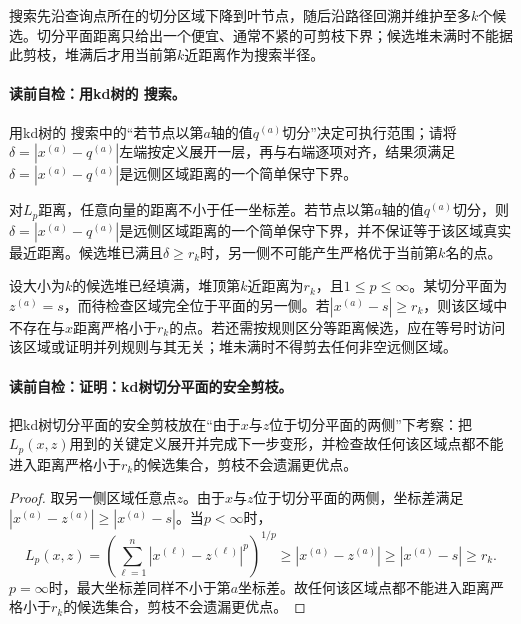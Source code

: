 搜索先沿查询点所在的切分区域下降到叶节点，随后沿路径回溯并维护至多$k$个候选。切分平面距离只给出一个便宜、通常不紧的可剪枝下界；候选堆未满时不能据此剪枝，堆满后才用当前第$k$近距离作为搜索半径。

\paragraph{读前自检：用kd树的 搜索。}用kd树的 搜索中的“若节点以第$a$轴的值$q^{(a)}$切分”决定可执行范围；请将$\delta=|x^{(a)}-q^{(a)}|$左端按定义展开一层，再与右端逐项对齐，结果须满足$\delta=|x^{(a)}-q^{(a)}|$是远侧区域距离的一个简单保守下界。\par

对$L_p$距离，任意向量的距离不小于任一坐标差。若节点以第$a$轴的值$q^{(a)}$切分，则$\delta=|x^{(a)}-q^{(a)}|$是远侧区域距离的一个简单保守下界，并不保证等于该区域真实最近距离。候选堆已满且$\delta\ge r_k$时，另一侧不可能产生严格优于当前第$k$名的点。

\begin{lemma}[kd树切分平面的安全剪枝]\label{lem:V2-C02-kd-prune}
设大小为$k$的候选堆已经填满，堆顶第$k$近距离为$r_k$，且$1\le p\le\infty$。某切分平面为$z^{(a)}=s$，而待检查区域完全位于平面的另一侧。若$|x^{(a)}-s|\ge r_k$，则该区域中不存在与$x$距离严格小于$r_k$的点。若还需按规则区分等距离候选，应在等号时访问该区域或证明并列规则与其无关；堆未满时不得剪去任何非空远侧区域。
\end{lemma}
\paragraph{读前自检：证明：kd树切分平面的安全剪枝。}把kd树切分平面的安全剪枝放在“由于$x$与$z$位于切分平面的两侧”下考察：把$L_p(x,z)$用到的关键定义展开并完成下一步变形，并检查故任何该区域点都不能进入距离严格小于$r_k$的候选集合，剪枝不会遗漏更优点。\par

\begin{proof}
取另一侧区域任意点$z$。由于$x$与$z$位于切分平面的两侧，坐标差满足$|x^{(a)}-z^{(a)}|\ge|x^{(a)}-s|$。当$p<\infty$时，
\[
L_p(x,z)=\left(\sum_{\ell=1}^{n}|x^{(\ell)}-z^{(\ell)}|^p\right)^{1/p}
\ge |x^{(a)}-z^{(a)}|
\ge |x^{(a)}-s|\ge r_k.
\]
$p=\infty$时，最大坐标差同样不小于第$a$坐标差。故任何该区域点都不能进入距离严格小于$r_k$的候选集合，剪枝不会遗漏更优点。
\end{proof}

